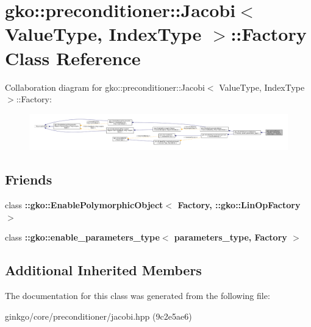 \hypertarget{classgko_1_1preconditioner_1_1Jacobi_1_1Factory}{}\section{gko\+:\+:preconditioner\+:\+:Jacobi$<$ Value\+Type, Index\+Type $>$\+:\+:Factory Class Reference}
\label{classgko_1_1preconditioner_1_1Jacobi_1_1Factory}


Collaboration diagram for gko\+:\+:preconditioner\+:\+:Jacobi$<$ Value\+Type, Index\+Type $>$\+:\+:Factory\+:
\nopagebreak
\begin{figure}[H]
\begin{center}
\leavevmode
\includegraphics[width=350pt]{classgko_1_1preconditioner_1_1Jacobi_1_1Factory__coll__graph}
\end{center}
\end{figure}
\subsection*{Friends}
\begin{DoxyCompactItemize}
\item 
\mbox{\label{classgko_1_1preconditioner_1_1Jacobi_1_1Factory_a27e9bbc94a1c1c59f40833153eda8f78}} 
class {\bfseries \+::gko\+::\+Enable\+Polymorphic\+Object$<$ Factory, \+::gko\+::\+Lin\+Op\+Factory $>$}
\item 
\mbox{\label{classgko_1_1preconditioner_1_1Jacobi_1_1Factory_a0d176cbd42d6214e11aee8c30ca256fc}} 
class {\bfseries \+::gko\+::enable\+\_\+parameters\+\_\+type$<$ parameters\+\_\+type, Factory $>$}
\end{DoxyCompactItemize}
\subsection*{Additional Inherited Members}


The documentation for this class was generated from the following file\+:\begin{DoxyCompactItemize}
\item 
ginkgo/core/preconditioner/jacobi.\+hpp (9c2e5ae6)\end{DoxyCompactItemize}
